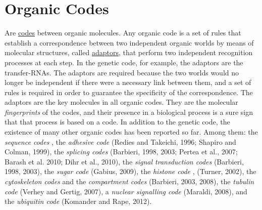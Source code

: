 \documentclass[12pt]{article}
\begin{document}
\section{Organic Codes}
Are \hyperlink{code}{codes} between organic molecules. Any organic code is a set of rules that establish a correspondence between two independent organic worlds by means of molecular structures, called \hyperlink{adaptor}{adaptors}, that perform two independent recognition processes at each step. In the genetic code, for example, the adaptors are the transfer-RNAs. The adaptors are required because the two worlds would no longer be independent if there were a necessary link between them, and a set of rules is required in order to guarantee the specificity of the correspondence. The adaptors are the key molecules in all organic codes. They are the molecular \textit{fingerprints} of the codes, and their presence in a biological process is a sure sign that that process is based on a code. In addition to the genetic code, the existence of many other organic codes has been reported so far. Among them: the \textit{sequence codes} \cite{trifonov87:_trans_framin_code_and_frame,trifonov89:_multip_codes_of_nucleot_sequen,trifonov99:_elucid_sequen_codes}, the \textit{adhesive code} (Redies and Takeichi, 1996; Shapiro and Colman, 1999), the \textit{splicing codes} (Barbieri, 1998, 2003; Pertea et al., 2007; Barash et al. 2010; Dihr et al., 2010), the \textit{signal transduction codes} (Barbieri, 1998, 2003), the \textit{sugar code} \cite{gabius00:_biolog_infor_trans_beyon_genet_code} (Gabius, 2009), the \textit{histone code} \cite{strahl00:_languag_of_coval_histon_modif,turner00:_histon_acety_and_epigen_code}, (Turner, 2002), the \textit{cytoskeleton codes} and the \textit{compartment codes} (Barbieri, 2003, 2008), the \textit{tubulin code} (Verhey and Gertig, 2007), a \textit{nuclear signalling code} (Maraldi, 2008), and the \textit{ubiquitin code} (Komander and Rape, 2012). 



\hypertarget{organic_information}{}
\end{document}
